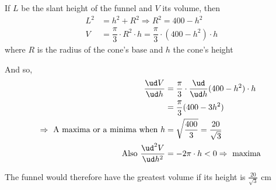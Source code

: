 \begin{solution}
   If $L$ be the slant height of the funnel and $V$ its volume, then 
   \begin{align}
       L^2 &= h^2 + R^2 \Rightarrow R^2 = 400 - h^2 \\ 
       V &= \dfrac{\pi}{3}\cdot R^2\cdot h = \dfrac{\pi}{3}\cdot(400 - h^2)\cdot h
   \end{align}
   where $R$ is the radius of the cone's base and $h$ the cone's height
   
   And so, 
   \begin{align}
      \dfrac{\ud V}{\ud h} &= \dfrac{\pi}{3}\cdot\dfrac{\ud}{\ud h}(400-h^2)\cdot h \\
             &= \dfrac{\pi}{3}(400 - 3h^2) \\
      \Rightarrow\text{ A maxima or a minima when } h &= \sqrt{\dfrac{400}{3}} = \dfrac{20}{\sqrt{3}} \\
      \text{Also }\dfrac{\ud^2 V}{\ud h^2} &= -2\pi\cdot h < 0 \Rightarrow \text{ maxima }
   \end{align}
   
   The funnel would therefore have the greatest volume if its height is $\frac{20}{\sqrt{3}}$ cm
   
\end{solution}
